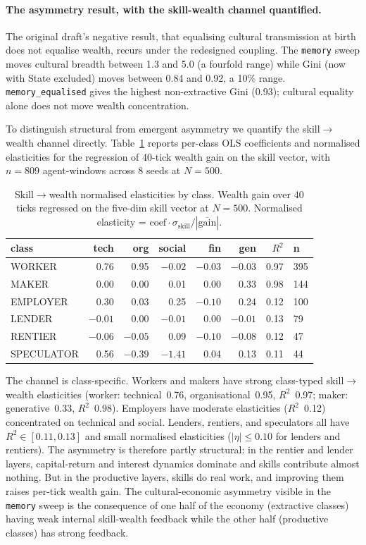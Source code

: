 \documentclass[11pt]{article}
\begin{document}
\paragraph{The asymmetry result, with the skill-wealth channel
quantified.} The original draft's negative result, that equalising
cultural transmission at birth does not equalise wealth, recurs
under the redesigned coupling. The \texttt{memory} sweep moves
cultural breadth between 1.3 and 5.0 (a fourfold range) while Gini
(now with State excluded) moves between 0.84 and 0.92, a 10\%
range. \texttt{memory\_equalised} gives the highest non-extractive
Gini (0.93); cultural equality alone does not move wealth concentration.

To distinguish structural from emergent asymmetry we quantify the
skill$\to$wealth channel directly.
Table~\ref{tab:elasticity} reports per-class OLS coefficients and
normalised elasticities for the regression of 40-tick wealth gain
on the skill vector, with $n=809$ agent-windows across 8 seeds at
$N=500$.

\begin{table}[t]
\centering
\small
\caption{Skill$\to$wealth normalised elasticities by class. Wealth
gain over 40 ticks regressed on the five-dim skill vector at
$N=500$. Normalised elasticity =
$\text{coef}\cdot\sigma_{\text{skill}}/|\overline{\text{gain}}|$.}
\label{tab:elasticity}
\begin{tabular}{lrrrrrrl}
\toprule
class & tech & org & social & fin & gen & $R^2$ & n \\
\midrule
WORKER     & 0.76 & 0.95 & $-0.02$ & $-0.03$ & $-0.03$ & 0.97 & 395 \\
MAKER      & 0.00 & 0.00 & 0.01 & 0.00 & 0.33 & 0.98 & 144 \\
EMPLOYER   & 0.30 & 0.03 & 0.25 & $-0.10$ & 0.24 & 0.12 & 100 \\
LENDER     & $-0.01$ & 0.00 & $-0.01$ & 0.00 & $-0.01$ & 0.13 & 79 \\
RENTIER    & $-0.06$ & $-0.05$ & 0.09 & $-0.10$ & $-0.08$ & 0.12 & 47 \\
SPECULATOR & 0.56 & $-0.39$ & $-1.41$ & 0.04 & 0.13 & 0.11 & 44 \\
\bottomrule
\end{tabular}
\end{table}

The channel is class-specific. Workers and makers have strong
class-typed skill$\to$wealth elasticities (worker:
technical~0.76, organisational~0.95, $R^2$~0.97; maker:
generative~0.33, $R^2$~0.98). Employers have moderate
elasticities ($R^2$~0.12) concentrated on technical and social.
Lenders, rentiers, and speculators all have $R^2 \in [0.11, 0.13]$
and small normalised elasticities ($|\eta| \leq 0.10$ for lenders
and rentiers). The asymmetry is therefore partly structural: in
the rentier and lender layers, capital-return and interest dynamics
dominate and skills contribute almost nothing. But in the productive
layers, skills do real work, and improving them raises per-tick
wealth gain. The cultural-economic asymmetry visible in the
\texttt{memory} sweep is the consequence of one half of the economy
(extractive classes) having weak internal skill-wealth feedback while
the other half (productive classes) has strong feedback.
\end{document}
